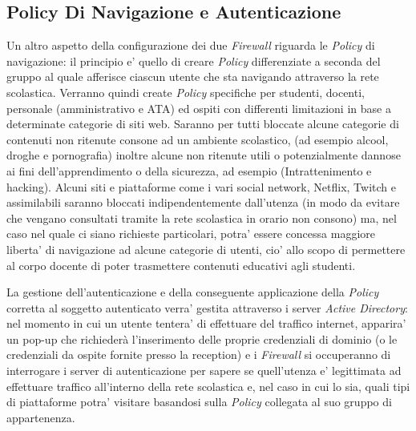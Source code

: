 \documentclass{report}
\begin{document}
        \subsection{Policy Di Navigazione e Autenticazione}
            Un altro aspetto della configurazione dei due \emph{Firewall} riguarda le \emph{Policy} di navigazione: il
             principio e' quello di creare \emph{Policy} differenziate a seconda del gruppo al quale afferisce ciascun utente 
             che sta navigando attraverso la rete scolastica. Verranno quindi create \emph{Policy} specifiche per studenti,
             docenti, personale (amministrativo e ATA) ed ospiti con differenti limitazioni in base a determinate categorie
             di siti web. Saranno per tutti bloccate alcune categorie di contenuti non ritenute consone ad un ambiente
             scolastico, (ad esempio alcool, droghe e pornografia) inoltre alcune non ritenute utili o potenzialmente
             dannose ai fini dell'apprendimento o della sicurezza, ad esempio (Intrattenimento e hacking).
             Alcuni siti e piattaforme come i vari social network, Netflix, Twitch e assimilabili saranno bloccati
             indipendentemente dall'utenza (in modo da evitare che vengano consultati tramite la rete scolastica in orario
             non consono) ma, nel caso nel quale ci siano richieste particolari, potra' essere concessa maggiore liberta' di
             navigazione ad alcune categorie di utenti, cio' allo scopo di permettere al corpo docente di poter trasmettere
             contenuti educativi agli studenti.

             La gestione dell’autenticazione e della conseguente applicazione della \emph{Policy} corretta al soggetto
             autenticato verra' gestita attraverso i server \emph{Active Directory}: nel momento in cui un utente tentera'
             di effettuare del traffico internet, apparira' un pop-up che richiederà l’inserimento delle proprie
             credenziali di dominio (o le credenziali da ospite fornite presso la reception) e i \emph{Firewall}
             si occuperanno di interrogare i server di autenticazione per sapere se quell’utenza e' legittimata
             ad effettuare traffico all’interno della rete scolastica e, nel caso in cui lo sia, quali tipi di
             piattaforme potra' visitare basandosi sulla \emph{Policy} collegata al suo gruppo di
             appartenenza.
\end{document}
